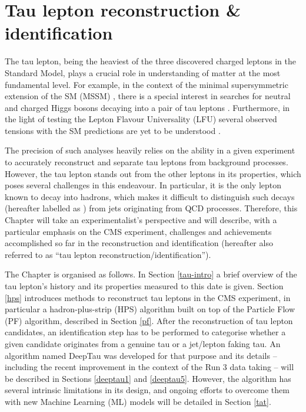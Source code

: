 \chapter{Tau lepton reconstruction \& identification}\label{sec:tau}

The tau lepton, being the heaviest of the three discovered charged leptons in the Standard Model, plays a crucial role in understanding of matter at the most fundamental level. For example, in the context of the minimal supersymmetric extension of the SM (MSSM) \cite{Fayet:1974pd, Fayet:1977yc}, there is a special interest in searches for neutral and charged Higgs bosons decaying into a pair of tau leptons \cite{CMS:2022goy}. Furthermore, in the light of testing the Lepton Flavour Universality (LFU) several observed tensions with the SM predictions are yet to be understood \cite{HFLAV:2022pwe, Cheaib:2022ral, LHCb:2017vlu, LHCb:2021trn}. 

The precision of such analyses heavily relies on the ability in a given experiment to accurately reconstruct and separate tau leptons from background processes. However, the tau lepton stands out from the other leptons in its properties, which poses several challenges in this endeavour. In particular, it is the only lepton known to decay into hadrons, which makes it difficult to distinguish such decays (hereafter labelled as \tauh) from jets originating from QCD processes. Therefore, this Chapter will take an experimentalist’s perspective and will describe, with a particular emphasis on the CMS experiment, challenges and achievements accomplished so far in the \tauh reconstruction and identification (hereafter also referred to as \enquote{tau lepton reconstruction/identification}).

The Chapter is organised as follows. In Section \ref{tau-intro} a brief overview of the tau lepton’s history and its properties measured to this date is given. Section \ref{hps} introduces methods to reconstruct tau leptons in the CMS experiment, in particular a hadron-plus-strip (HPS) algorithm built on top of the Particle Flow (PF) algorithm, described in Section \ref{pf}. After the reconstruction of tau lepton candidates, an identification step has to be performed to categorise whether a given candidate originates from a genuine tau or a jet/lepton faking tau. An algorithm named DeepTau was developed for that purpose and its details -- including the recent improvement in the context of the Run 3 data taking -- will be described in Sections \ref{deeptau1} and \ref{deeptau5}. However, the algorithm has several intrinsic limitations in its design, and ongoing efforts to overcome them with new Machine Learning (ML) models will be detailed in Section \ref{tat}.

